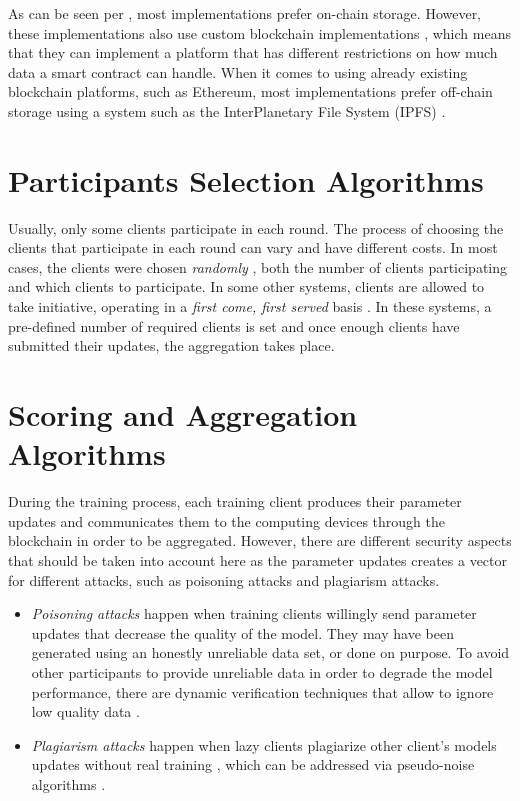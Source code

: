 As can be seen per , most implementations prefer on-chain storage. However, these implementations also use custom blockchain implementations \cite{8733825, 9524833, 8894364, 9184854, 8893114}, which means that they can implement a platform that has different restrictions on how much data a smart contract can handle. When it comes to using already existing blockchain platforms, such as Ethereum, most implementations prefer off-chain storage using a system such as the InterPlanetary File System (IPFS) \cite{10.48550/arxiv.2007.03856, 8945913, Peyvandi2022, 9170559, 10.1145/3319535.3363256, 10.48550/arxiv.2011.07516}.

\section{Participants Selection Algorithms}\label{related_work:participants_selection}

Usually, only some clients participate in each round. The process of choosing the clients that participate in each round can vary and have different costs. In most cases, the clients were chosen \textit{randomly} \cite{Peyvandi2022, demo, 9293091}, both the number of clients participating and which clients to participate. In some other systems, clients are allowed to take initiative, operating in a \textit{first come, first served} basis \cite{9184854, FANG20221}. In these systems, a pre-defined number of required clients is set and once enough clients have submitted their updates, the aggregation takes place.

\section{Scoring and Aggregation Algorithms}\label{related_work:scoring_techniques}

During the training process, each training client produces their parameter updates and communicates them to the computing devices through the blockchain in order to be aggregated. However, there are different security aspects that should be taken into account here as the parameter updates creates a vector for different attacks, such as poisoning attacks and plagiarism attacks.

\begin{itemize}
    \item \textit{Poisoning attacks} happen when training clients willingly send parameter updates that decrease the quality of the model. They may have been generated using an honestly unreliable data set, or done on purpose. To avoid other participants to provide unreliable data in order to degrade the model performance, there are dynamic verification techniques that allow to ignore low quality data \cite{10.48550/arxiv.2110.02182, 10.48550/arxiv.2104.10501}.
    
    \item \textit{Plagiarism attacks} happen when lazy clients plagiarize other client's models updates without real training \cite{9403374}, which can be addressed via pseudo-noise algorithms \cite{10.48550/arxiv.2009.09338}.
\end{itemize}

